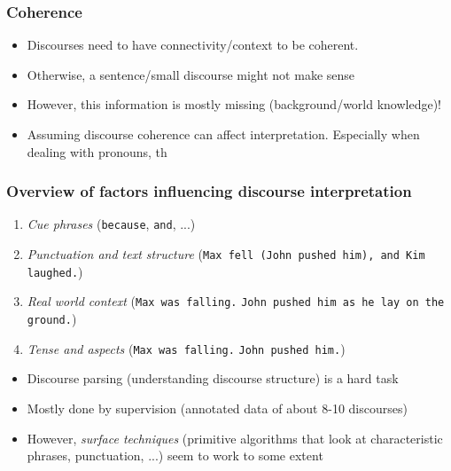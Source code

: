 \subsubsection{Coherence}
\begin{itemize}
	\item Discourses need to have connectivity/context to be coherent.
	\item Otherwise, a sentence/small discourse might not make sense
	\item However, this information is mostly missing (background/world knowledge)!
	\item Assuming discourse coherence can affect interpretation. Especially when dealing with pronouns, th
\end{itemize}
\subsubsection{Overview of factors influencing discourse interpretation}
\begin{enumerate}
	\item \textit{Cue phrases} (\texttt{because}, \texttt{and}, ...)
	\item \textit{Punctuation and text structure} (\texttt{Max fell (John pushed him), and Kim laughed.})
	\item \textit{Real world context} (\texttt{Max was falling.} \texttt{John pushed him as he lay on the ground.})
	\item \textit{Tense and aspects} (\texttt{Max was falling.} \texttt{John pushed him.})
\end{enumerate}
\begin{itemize}
	\item Discourse parsing (understanding discourse structure) is a hard task
	\item Mostly done by supervision (annotated data of about 8-10 discourses)
	\item However, \textit{surface techniques} (primitive algorithms that look at characteristic phrases, punctuation, ...) seem to work to some extent
\end{itemize}
